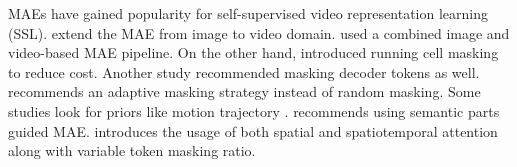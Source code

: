 MAEs have gained popularity for self-supervised video representation learning (SSL). \cite{maest, videomae} extend the MAE from image to video domain. \cite{omnimae} used a combined image and video-based MAE pipeline. On the other hand, \cite{qing2023mar} introduced running cell masking to reduce cost. Another study \cite{videomaev2} recommended masking decoder tokens as well. \cite{adamae} recommends an adaptive masking strategy instead of random masking. Some studies look for priors like motion trajectory \cite{mgmae,patrick2021keeping, Sun_2023_CVPR}. \cite{li2022semmae} recommends using semantic parts guided MAE. \cite{maskvit} introduces the usage of both spatial and spatiotemporal attention along with variable token masking ratio.
